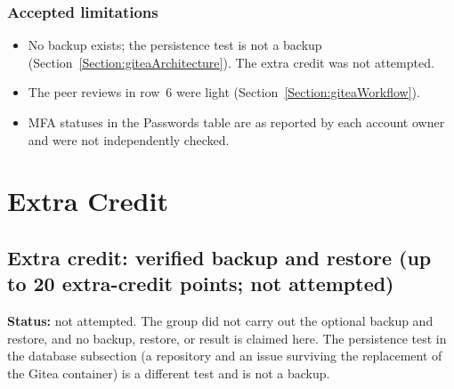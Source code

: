 \subsubsection{Accepted limitations}
\begin{itemize}[nosep]
  \item No backup exists; the persistence test is not a backup
  (Section~\ref{Section:giteaArchitecture}). The extra credit was not attempted.
  \item The peer reviews in row~6 were light (Section~\ref{Section:giteaWorkflow}).
  \item MFA statuses in the Passwords table are as reported by each account
  owner and were not independently checked.
\end{itemize}

\section{Extra Credit}
\subsection{Extra credit: verified backup and restore (up to 20 extra-credit points; not attempted)}
\label{Section:giteaExtraCredit}
\textbf{Status:} not attempted. The group did not carry out the optional backup and restore, and no backup, restore, or result is claimed here. The persistence test in the database subsection (a repository and an issue surviving the replacement of the Gitea container) is a different test and is not a backup.

